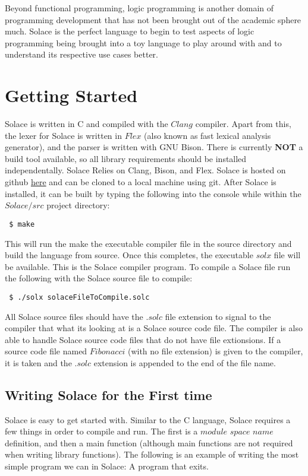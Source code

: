 \documentclass{article}
\begin{document}
Beyond functional programming, logic programming is another domain of programming development that has not been brought out
of the academic sphere much. Solace is the perfect language to begin to test aspects of logic programming being brought into a
toy language to play around with and to understand its respective use cases better.


\section{Getting Started}
Solace is written in C and compiled with the $Clang$ compiler. Apart from this, the lexer for Solace is written in $Flex$
(also known as fast lexical analysis generator), and the parser is written with GNU Bison. There is currently \textbf{NOT} a 
build tool available, so all library requirements should be installed independentally. Solace Relies on Clang, Bison, and Flex.
Solace is hosted on github \href{https://github.com/JustSomeCarbon/Solace/tree/main}{here} and can be cloned to a local machine
using git. After Solace is installed, it can be built by typing the following into the console while within the $Solace/src$
project directory:

\begin{lstlisting}
 $ make
\end{lstlisting}

This will run the make the executable compiler file in the source directory and build the language from source.
Once this completes, the executable $solx$ file will be available. This is the Solace compiler program.
To compile a Solace file run the following with the Solace source file to compile:

\begin{lstlisting}
 $ ./solx solaceFileToCompile.solc
\end{lstlisting}

All Solace source files should have the $.solc$ file extension to signal to the compiler that what its looking at is a
Solace source code file. The compiler is also able to handle Solace source code files that do not have file extionsions.
If a source code file named $Fibonacci$ (with no file extension) is given to the compiler, it is taken and the $.solc$ extension
is appended to the end of the file name.

\subsection{Writing Solace for the First time}
Solace is easy to get started with. Similar to the C language, Solace requires a few things in order to compile
and run. The first is a $module$ $space$ $name$ definition, and then a main function (although main functions are not required when
writing library functions). The following is an example of writing the most simple program we can in Solace: A program
that exits.
\end{document}
